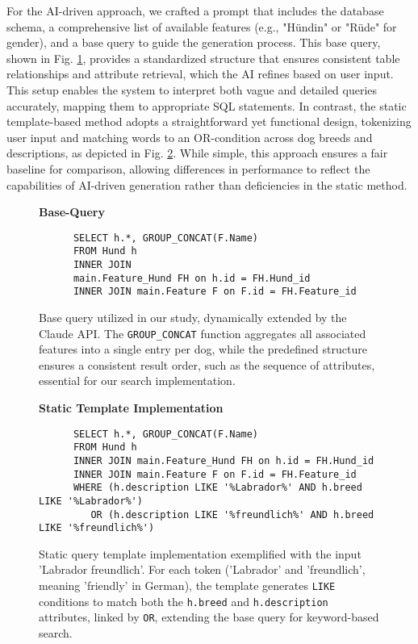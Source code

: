 \documentclass[../../submission.tex]{subfiles}
\begin{document}
For the AI-driven approach, we crafted a prompt that includes the database schema, a comprehensive list of available features (e.g., "Hündin" or "Rüde" for gender), 
and a base query to guide the generation process. This base query, shown in Fig. \ref{fig:base_query}, provides a standardized structure that ensures consistent 
table relationships and attribute retrieval, which the AI refines based on user input. This setup enables the system to interpret both vague and detailed queries 
accurately, mapping them to appropriate SQL statements. In contrast, the static template-based method adopts a straightforward yet functional design, tokenizing 
user input and matching words to an OR-condition across dog breeds and descriptions, as depicted in Fig. \ref{fig:static_template}. While simple, this approach 
ensures a fair baseline for comparison, allowing differences in performance to reflect the capabilities of AI-driven generation rather than deficiencies in the 
static method.

\begin{figure}[h]
   \centering
   \textbf{Base-Query}\par\medskip
   \begin{lstlisting}
      SELECT h.*, GROUP_CONCAT(F.Name) 
      FROM Hund h 
      INNER JOIN 
      main.Feature_Hund FH on h.id = FH.Hund_id 
      INNER JOIN main.Feature F on F.id = FH.Feature_id
   \end{lstlisting}
   \caption{Base query utilized in our study, dynamically extended by the Claude API. The \texttt{GROUP\_CONCAT} function aggregates all associated features into a single entry per dog, while the predefined structure ensures a consistent result order, such as the sequence of attributes, essential for our search implementation.}
   \label{fig:base_query} %
\end{figure}

\begin{figure}[h]
   \centering
   \textbf{Static Template Implementation}\par\medskip
   \begin{lstlisting}
      SELECT h.*, GROUP_CONCAT(F.Name) 
      FROM Hund h 
      INNER JOIN main.Feature_Hund FH on h.id = FH.Hund_id 
      INNER JOIN main.Feature F on F.id = FH.Feature_id
      WHERE (h.description LIKE '%Labrador%' AND h.breed LIKE '%Labrador%') 
         OR (h.description LIKE '%freundlich%' AND h.breed LIKE '%freundlich%')
   \end{lstlisting}
   \caption{Static query template implementation exemplified with the input 'Labrador freundlich'. For each token ('Labrador' and 'freundlich', meaning 'friendly' in German), the template generates \texttt{LIKE} conditions to match both the \texttt{h.breed} and \texttt{h.description} attributes, linked by \texttt{OR}, extending the base query for keyword-based search.}
   \label{fig:static_template}
\end{figure}
\end{document}
